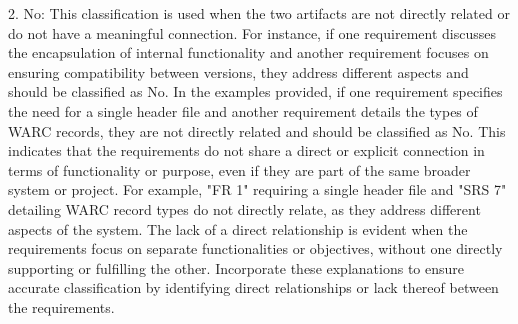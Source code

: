 2. \*\*No\*\*: This classification is used when the two artifacts are not directly related or do not have a meaningful connection. For instance, if one requirement discusses the encapsulation of internal functionality and another requirement focuses on ensuring compatibility between versions, they address different aspects and should be classified as \textquotesingle{}No\textquotesingle{}. In the examples provided, if one requirement specifies the need for a single header file and another requirement details the types of WARC records, they are not directly related and should be classified as \textquotesingle{}No\textquotesingle{}. This indicates that the requirements do not share a direct or explicit connection in terms of functionality or purpose, even if they are part of the same broader system or project. For example, "FR 1" requiring a single header file and "SRS 7" detailing WARC record types do not directly relate, as they address different aspects of the system. The lack of a direct relationship is evident when the requirements focus on separate functionalities or objectives, without one directly supporting or fulfilling the other.\newline
\newline
Incorporate these explanations to ensure accurate classification by identifying direct relationships or lack thereof between the requirements.